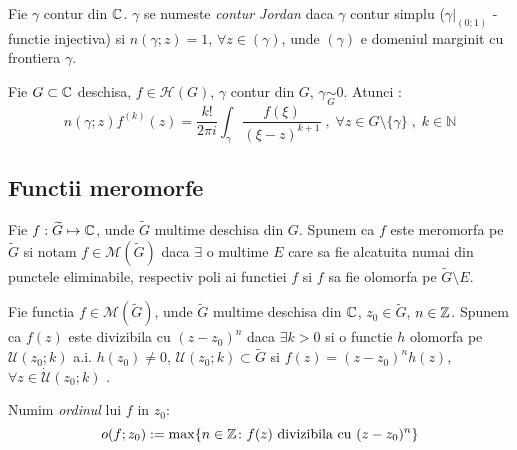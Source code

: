 \begin{definition}
    Fie $\gamma$ contur din $\mathbb{C}$. $\gamma$ se numeste \emph{contur Jordan} daca
    $\gamma$ contur simplu ($\gamma|_{(0;1)}$ - functie injectiva) si $n(\gamma;z) = 1$,
    $\forall z \in (\gamma)$, unde $(\gamma)$ e domeniul marginit cu frontiera $\gamma$.
\end{definition}

\begin{theorem}
    Fie $G \subset \mathbb{C}$ deschisa, $f \in \mathcal{H}(G)$, $\gamma$ contur din $G$,
    $\gamma \underset{G}{\sim} 0$. Atunci :
    \begin{equation}
        n(\gamma;z) f^{(k)}(z) = \frac{k!}{2 \pi i} \int_{\gamma} \frac{f(\xi)}{(\xi-z)^{k+1}}
        \;,\; \forall z \in G \setminus \{\gamma\} \;,\; k \in \mathbb{N}
    \end{equation}
\end{theorem}

\subsection{Functii meromorfe}

\begin{definition}
    Fie $f : \widetilde{G} \mapsto \mathbb{C}$, unde $\widetilde{G}$ multime deschisa din $G$.
    Spunem ca $f$ este meromorfa pe $\widetilde{G}$ si notam $f\in \mathcal{M}(\widetilde{G})$ daca
    $\exists$ o multime $E$ care sa fie alcatuita numai din punctele eliminabile, respectiv poli
    ai functiei $f$ si $f$ sa fie olomorfa pe $\widetilde{G} \setminus E$.
\end{definition}

\begin{definition}
    Fie functia $f \in \mathcal{M}(\widetilde{G})$, unde $\widetilde{G}$ multime deschisa
    din  $\mathbb{C}$, $z_0 \in \widetilde{G}$, $n \in \mathbb{Z}$. Spunem ca $f(z)$ este divizibila cu
    $(z-z_0)^n$ daca $\exists k >0$ si o functie $h$ olomorfa pe $\mathcal{U}(z_0;k)$ a.i.
    $h(z_0) \neq 0$, $\mathcal{U}(z_0;k) \subset \widetilde{G}$ si
    $f(z) = (z-z_0)^n h(z)$, $\forall z \in \dot{\mathcal{U}}(z_0;k)$ .
\end{definition}

\begin{definition}
    Numim \emph{ordinul} lui $f$ in $z_0$:
    \begin{equation}
        o (f;z_0) := \max \{n \in \mathbb{Z} \colon f(z) \text{ divizibila cu } (z-z_0)^n \}
    \end{equation}
\end{definition}

